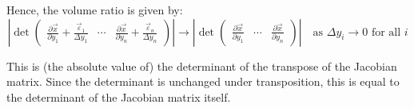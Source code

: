 \documentclass[letterpaper, 12pt]{article}
\theoremstyle{custom}
\begin{document}
Hence, the volume ratio is given by:
\begin{equation*}
  \left| \det 
  \begin{pmatrix}
    \displaystyle \frac{\partial \vec{x}}{\partial y_1} + \frac{\vec{\varepsilon}_1}{\Delta y_1} & \cdots & \displaystyle \frac{\partial \vec{x}}{\partial y_n} + \frac{\vec{\varepsilon}_n}{\Delta y_n} 
  \end{pmatrix} \right|
  \rightarrow \left| \det 
  \begin{pmatrix}
    \displaystyle \frac{\partial \vec{x}}{\partial y_1} & \cdots & \displaystyle \frac{\partial \vec{x}}{\partial y_n} 
  \end{pmatrix} \right| \quad \text{as } \Delta y_i \rightarrow 0 \text{ for all } i
\end{equation*}

This is (the absolute value of) the determinant of the transpose of the Jacobian matrix.
Since the determinant is unchanged under transposition, this is equal to the determinant of the Jacobian matrix itself.
\end{document}
